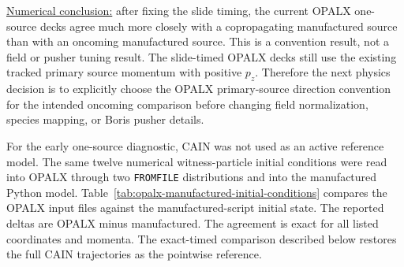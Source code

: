 \documentclass[11pt]{article}
\begin{document}
\noindent\underline{Numerical conclusion:} after fixing the slide timing, the
current OPALX one-source decks agree much more closely with a copropagating
manufactured source than with an oncoming manufactured source.  This is a
convention result, not a field or pusher tuning result.  The
slide-timed OPALX decks still use the existing tracked primary source momentum
with positive \(p_z\).  Therefore the next physics decision is to explicitly
choose the OPALX primary-source direction convention for the intended oncoming
comparison before changing field normalization, species mapping, or Boris
pusher details.

For the early one-source diagnostic, CAIN was not used as an active reference
model.  The same twelve numerical witness-particle initial conditions were
read into OPALX through two \texttt{FROMFILE} distributions and into the
manufactured Python model.  Table~\ref{tab:opalx-manufactured-initial-conditions}
compares the OPALX input files against the manufactured-script initial state.
The reported deltas are OPALX minus manufactured.  The agreement is exact for
all listed coordinates and momenta.  The exact-timed comparison described
below restores the full CAIN trajectories as the pointwise reference.
\end{document}
